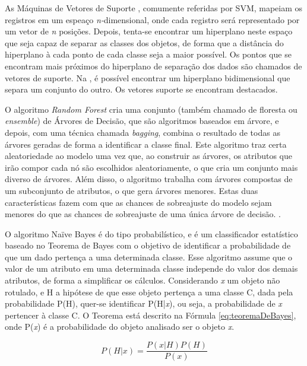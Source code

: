 As Máquinas de Vetores de Suporte \cite{svm}, comumente referidas por SVM, mapeiam os registros em um espeaço \textit{n-}dimensional, onde cada registro será representado por um vetor de \textit{n} posições. Depois, tenta-se encontrar um hiperplano neste espaço que seja capaz de separar as classes dos objetos, de forma que a distância do hiperplano à cada ponto de cada classe seja a maior possível. Os pontos que se encontram mais próximos do hiperplano de separação dos dados são chamados de vetores de suporte. Na , é possível encontrar um hiperplano bidimensional que separa um conjunto do outro. Os vetores suporte se encontram destacados.

%

O algoritmo \textit{Random Forest} cria uma conjunto (também chamado de floresta ou \textit{ensemble}) de Árvores de Decisão, que são algoritmos baseados em árvore, e depois, com uma técnica chamada \textit{bagging}, combina o resultado de todas as árvores geradas de forma a identificar a classe final. Este algoritmo traz certa aleatoriedade ao modelo uma vez que, ao construir as árvores, os atributos que irão compor cada nó são escolhidos aleatoriamente, o que cria um conjunto mais diverso de árvores. Além disso, o algoritmo trabalha com árvores compostas de um subconjunto de atributos, o que gera árvores menores. Estas duas características fazem com que as chances de sobreajuste do modelo sejam menores do que as chances de sobreajuste de uma única árvore de decisão. \cite{randomforests}.

O algoritmo Naïve Bayes \cite{silva_introducao_2016} é do tipo probabilístico, e é um classificador estatístico baseado no Teorema de Bayes \cite{bussab_estatistica_2017} com o objetivo de identificar a probabilidade de que um dado pertença a uma determinada classe. Esse algoritmo assume que o valor de um atributo em uma determinada classe independe do valor dos demais atributos, de forma a simplificar os cálculos. Considerando \textit{x} um objeto não rotulado, e H a hipótese de que esse objeto pertença a uma classe C, dada pela probabilidade P(H), quer-se identificar P(H|\textit{x}), ou seja, a probabilidade de \textit{x }pertencer à classe C.  O Teorema está descrito na Fórmula \ref{eq:teoremaDeBayes}, onde P(\textit{x}) é a probabilidade do objeto analisado ser o objeto \textit{x}.

\begin{equation}\label{eq:teoremaDeBayes}
P(H|\textit{x}) = \frac{P(\textit{x}|H)P(H)}{P(\textit{x})}
\end{equation}


